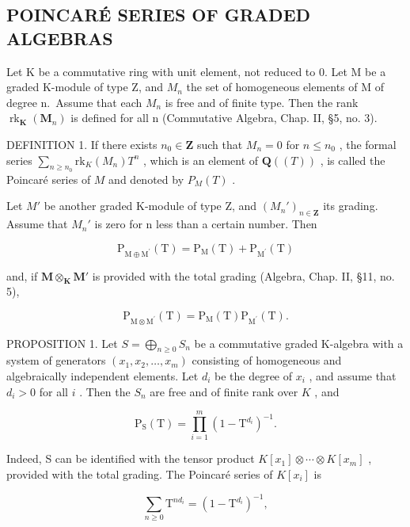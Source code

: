 \subsection{POINCARÉ SERIES OF GRADED ALGEBRAS}

Let K be a commutative ring with unit element, not reduced to 0. Let M be a graded K-module of type Z, and \(M_{n}\) the set of homogeneous elements of M of degree n.~Assume that each \(M_{n}\) is free and of finite type. Then the rank \(\operatorname{rk}_{\mathbf{K}}(\mathbf{M}_{n})\) is defined for all n (Commutative Algebra, Chap. II, §5, no. 3).

DEFINITION 1. If there exists \(n_0 \in \mathbf{Z}\) such that \(M_n = 0\) for \(n \leqslant n_0\) , the formal series \(\sum_{n \geqslant n_0} \mathrm{rk}_K(M_n) T^n\) , which is an element of \(\mathbf{Q}((T))\) , is called the Poincaré series of \(M\) and denoted by \(P_M(T)\) .

Let \(M'\) be another graded K-module of type Z, and \((M_n')_{n \in \mathbf{Z}}\) its grading. Assume that \(M_n'\) is zero for n less than a certain number. Then

\[
\mathrm{P} _ {\mathrm{M} \oplus \mathrm{M} ^ {\prime}} (\mathrm{T}) = \mathrm{P} _ {\mathrm{M}} (\mathrm{T}) + \mathrm{P} _ {\mathrm{M} ^ {\prime}} (\mathrm{T})\tag{1}
\]

and, if \(\mathbf{M} \otimes_{\mathbf{K}} \mathbf{M}'\) is provided with the total grading (Algebra, Chap. II, §11, no. 5),

\[
\mathrm{P} _ {\mathrm{M} \otimes \mathrm{M} ^ {\prime}} (\mathrm{T}) = \mathrm{P} _ {\mathrm{M}} (\mathrm{T}) \mathrm{P} _ {\mathrm{M} ^ {\prime}} (\mathrm{T}).\tag{2}
\]

PROPOSITION 1. Let \(S = \bigoplus_{n \geqslant 0} S_n\) be a commutative graded K-algebra with a system of generators \((x_1, x_2, \ldots, x_m)\) consisting of homogeneous and algebraically independent elements. Let \(d_i\) be the degree of \(x_i\) , and assume that \(d_i > 0\) for all \(i\) . Then the \(S_n\) are free and of finite rank over \(K\) , and

\[
\mathrm{P} _ {\mathrm{S}} (\mathrm{T}) = \prod_ {i = 1} ^ {m} (1 - \mathrm{T} ^ {d _ {i}}) ^ {- 1}.\tag{3}
\]

Indeed, S can be identified with the tensor product \(K[x_{1}] \otimes \cdots \otimes K[x_{m}]\) , provided with the total grading. The Poincaré series of \(K[x_{i}]\) is

\[
\sum_ {n \geqslant 0} \mathrm{T} ^ {n d _ {i}} = (1 - \mathrm{T} ^ {d _ {i}}) ^ {- 1},
\]

